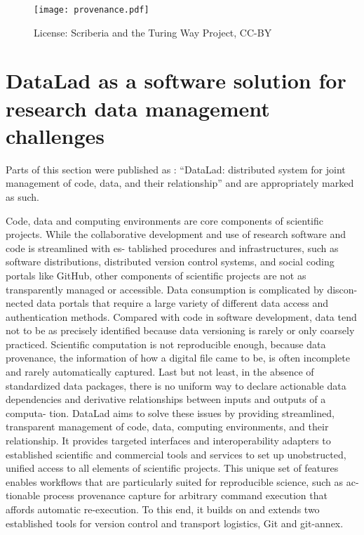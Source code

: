 \begin{figure}
	\centering
	\texttt{[image: provenance.pdf]}
	\caption{License: Scriberia and the Turing Way Project, CC-BY}
	\label{fig:prov1}
\end{figure}



\pagebreak

\section{DataLad as a software solution for research data management challenges}

Parts of this section were published as \citet{Halchenko2021}: ``DataLad: distributed system for joint management of code, data, and their relationship'' and are appropriately marked as such.


Code, data and computing environments are core components of scientific projects. While
the collaborative development and use of research software and code is streamlined with es-
tablished procedures and infrastructures, such as software distributions, distributed version
control systems, and social coding portals like GitHub, other components of scientific projects
are not as transparently managed or accessible. Data consumption is complicated by discon-
nected data portals that require a large variety of different data access and authentication
methods. Compared with code in software development, data tend not to be as precisely
identified because data versioning is rarely or only coarsely practiced. Scientific computation
is not reproducible enough, because data provenance, the information of how a digital file
came to be, is often incomplete and rarely automatically captured. Last but not least, in
the absence of standardized data packages, there is no uniform way to declare actionable
data dependencies and derivative relationships between inputs and outputs of a computa-
tion. DataLad aims to solve these issues by providing streamlined, transparent management
of code, data, computing environments, and their relationship. It provides targeted interfaces
and interoperability adapters to established scientific and commercial tools and services to
set up unobstructed, unified access to all elements of scientific projects. This unique set of
features enables workflows that are particularly suited for reproducible science, such as ac-
tionable process provenance capture for arbitrary command execution that affords automatic
re-execution. To this end, it builds on and extends two established tools for version control
and transport logistics, Git and git-annex.

\pagebreak

